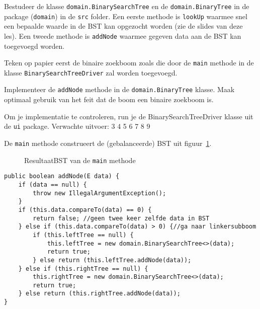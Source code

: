 \begin{oef}
\papier \code Bestudeer de klasse \verb=domain.BinarySearchTree= en de \verb=domain.BinaryTree= in de package (\verb=domain=) in de \verb=src= folder.
 Een eerste  methode is \verb=lookUp= waarmee snel een bepaalde waarde in de BST kan opgezocht worden (zie de slides van deze les). Een tweede methode is \verb=addNode= waarmee gegeven data aan de BST kan toegevoegd worden.

\begin{oefenumerate}
\item Teken op papier eerst de binaire zoekboom zoals die door de \verb+main+ methode in de klasse \verb+BinarySearchTreeDriver+ zal worden toegevoegd.
\item Implementeer de \verb=addNode= methode in de \verb=domain.BinaryTree= klasse.  Maak optimaal gebruik van het feit dat de boom een binaire zoekboom is.
\item Om je implementatie te controleren, run je de BinarySearchTreeDriver klasse uit de \verb+ui+ package. Verwachte uitvoer: 3 4 5 6 7 8 9  
\end{oefenumerate}
\begin{opl}
De \verb+main+ methode construeert de (gebalanceerde) BST uit figuur~\ref{fig:oefBSTmain}.
\begin{figure}[htbp]
    \centering
{}
\cprotect\caption{ResultaatBST van de \verb+main+ methode}
    \label{fig:oefBSTmain}
\end{figure}
\begin{lstlisting}[caption={addNode(data) methode}, label=bstaddnode]
public boolean addNode(E data) {
	if (data == null) {
		throw new IllegalArgumentException();
	}
	if (this.data.compareTo(data) == 0) {
		return false; //geen twee keer zelfde data in BST
	} else if (this.data.compareTo(data) > 0) {//ga naar linkersubboom
		if (this.leftTree == null) {
			this.leftTree = new domain.BinarySearchTree<>(data);
			return true;
		} else return (this.leftTree.addNode(data));
	} else if (this.rightTree == null) {
		this.rightTree = new domain.BinarySearchTree<>(data);
		return true;
	} else return (this.rightTree.addNode(data));
}
\end{lstlisting}

\end{opl}
\end{oef}


